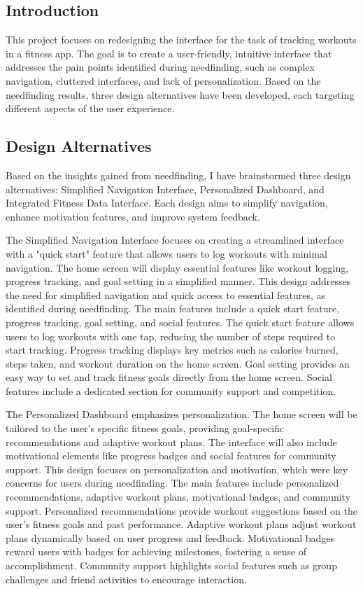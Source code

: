 \documentclass[
	letterpaper, %
]{jdf}
\begin{document}
\subsection{Introduction}
This project focuses on redesigning the interface for the task of tracking workouts in a fitness app. The goal is to create a user-friendly, intuitive interface that addresses the pain points identified during needfinding, such as complex navigation, cluttered interfaces, and lack of personalization. Based on the needfinding results, three design alternatives have been developed, each targeting different aspects of the user experience.

\subsection{Design Alternatives}
Based on the insights gained from needfinding, I have brainstormed three design alternatives: Simplified Navigation Interface, Personalized Dashboard, and Integrated Fitness Data Interface. Each design aims to simplify navigation, enhance motivation features, and improve system feedback.

The Simplified Navigation Interface focuses on creating a streamlined interface with a "quick start" feature that allows users to log workouts with minimal navigation. The home screen will display essential features like workout logging, progress tracking, and goal setting in a simplified manner. This design addresses the need for simplified navigation and quick access to essential features, as identified during needfinding. The main features include a quick start feature, progress tracking, goal setting, and social features. The quick start feature allows users to log workouts with one tap, reducing the number of steps required to start tracking. Progress tracking displays key metrics such as calories burned, steps taken, and workout duration on the home screen. Goal setting provides an easy way to set and track fitness goals directly from the home screen. Social features include a dedicated section for community support and competition.

The Personalized Dashboard emphasizes personalization. The home screen will be tailored to the user's specific fitness goals, providing goal-specific recommendations and adaptive workout plans. The interface will also include motivational elements like progress badges and social features for community support. This design focuses on personalization and motivation, which were key concerns for users during needfinding. The main features include personalized recommendations, adaptive workout plans, motivational badges, and community support. Personalized recommendations provide workout suggestions based on the user's fitness goals and past performance. Adaptive workout plans adjust workout plans dynamically based on user progress and feedback. Motivational badges reward users with badges for achieving milestones, fostering a sense of accomplishment. Community support highlights social features such as group challenges and friend activities to encourage interaction.
\end{document}
